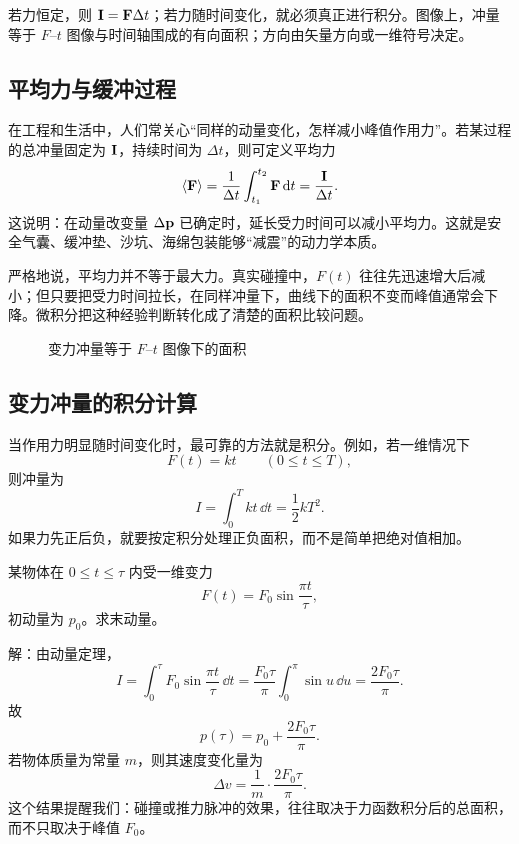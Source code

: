 \begin{remark}
若力恒定，则 $\vb I=\vb F\Delta t$；若力随时间变化，就必须真正进行积分。图像上，冲量等于 $F$--$t$ 图像与时间轴围成的有向面积；方向由矢量方向或一维符号决定。
\end{remark}

\subsection{平均力与缓冲过程}

在工程和生活中，人们常关心“同样的动量变化，怎样减小峰值作用力”。若某过程的总冲量固定为 $\vb I$，持续时间为 $\Delta t$，则可定义平均力
\[
\langle \vb F \rangle=\frac{1}{\Delta t}\int_{t_1}^{t_2}\vb F\,\dd t=\frac{\vb I}{\Delta t}.
\]
这说明：在动量改变量 $\Delta\vb p$ 已确定时，延长受力时间可以减小平均力。这就是安全气囊、缓冲垫、沙坑、海绵包装能够“减震”的动力学本质。

严格地说，平均力并不等于最大力。真实碰撞中，$F(t)$ 往往先迅速增大后减小；但只要把受力时间拉长，在同样冲量下，曲线下的面积不变而峰值通常会下降。微积分把这种经验判断转化成了清楚的面积比较问题。

\begin{figure}[H]
\centering
{}
\caption{变力冲量等于 $F$--$t$ 图像下的面积}
\end{figure}

\subsection{变力冲量的积分计算}

当作用力明显随时间变化时，最可靠的方法就是积分。例如，若一维情况下
\[
F(t)=kt\qquad (0\le t\le T),
\]
则冲量为
\[
I=\int_0^T kt\,\dd t=\frac12 kT^2.
\]
如果力先正后负，就要按定积分处理正负面积，而不是简单把绝对值相加。

\begin{example}
某物体在 $0\le t\le \tau$ 内受一维变力
\[
F(t)=F_0\sin\frac{\pi t}{\tau},
\]
初动量为 $p_0$。求末动量。

解：由动量定理，
\[
I=\int_0^{\tau}F_0\sin\frac{\pi t}{\tau}\,\dd t
=\frac{F_0\tau}{\pi}\int_0^{\pi}\sin u\,\dd u
=\frac{2F_0\tau}{\pi}.
\]
故
\[
p(\tau)=p_0+\frac{2F_0\tau}{\pi}.
\]
若物体质量为常量 $m$，则其速度变化量为
\[
\Delta v=\frac{1}{m}\cdot \frac{2F_0\tau}{\pi}.
\]
这个结果提醒我们：碰撞或推力脉冲的效果，往往取决于力函数积分后的总面积，而不只取决于峰值 $F_0$。
\end{example}

